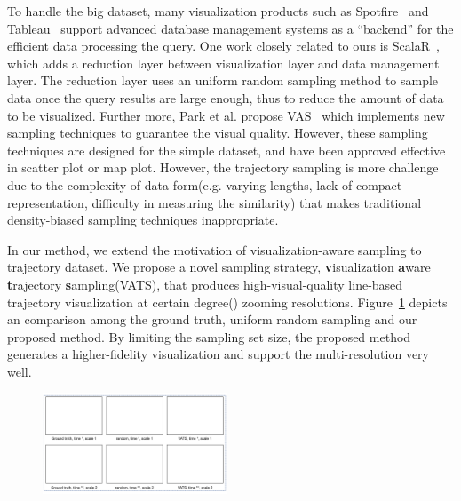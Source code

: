 To handle the big dataset, many visualization products such as Spotfire~\cite{} and Tableau~\cite{} support advanced database management systems as a ``backend'' for the efficient data processing the query.
One work closely related to ours is ScalaR~\cite{battle2013dynamic}, which adds a reduction layer between visualization layer and data management layer. The reduction layer uses an uniform random sampling method to sample data once the query results are large enough, thus to reduce the amount of data to be visualized.
Further more, Park et al. propose VAS~\cite{park2016visualization} which implements new sampling techniques to guarantee the visual quality. However, these sampling techniques are designed for the simple dataset, and have been approved effective in scatter plot or map plot. However, the trajectory sampling is more challenge due to the complexity of data form(e.g. varying lengths, lack of compact representation, difficulty in measuring the similarity) that makes traditional density-biased sampling techniques inappropriate.

In our method, we extend the motivation of visualization-aware sampling to trajectory dataset. We propose a novel sampling strategy, \textbf{v}isualization \textbf{a}ware \textbf{t}rajectory \textbf{s}ampling(VATS), that produces high-visual-quality line-based trajectory visualization at certain degree() zooming resolutions. 
Figure~\ref{fig:compare} depicts an comparison among the ground truth,  uniform random sampling and our proposed method. By limiting the sampling set size, the proposed method generates a higher-fidelity visualization and support the multi-resolution very well.   

\begin{figure}[t]
	\centering
	\includegraphics[width=0.49\textwidth]{pictures/introduction/compare.png}
	\vspace{-5mm}
	\caption{ }
	\vspace{-5mm}
	\label{fig:compare}
\end{figure}

